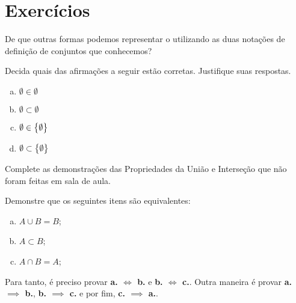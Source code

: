 \section{Exercícios}

\begin{exercise}
\label{exe:vazio-notacao}
	De que outras formas podemos representar o  utilizando as duas notações de definição de conjuntos que conhecemos?
\end{exercise}


\begin{exercise}
	Decida quais das afirmações a seguir estão corretas. Justifique suas respostas.
	\begin{enumerate}[a.]
		\item $\emptyset \in \emptyset$	
		\item $\emptyset \subset \emptyset$
		\item $\emptyset \in \left\{ \emptyset\right\}$
		\item $\emptyset \subset \left\{ \emptyset\right\}$
	\end{enumerate}
\end{exercise}



\begin{exercise}
Complete as demonstrações das Propriedades da União e Interseção que não foram feitas em sala de aula.
\end{exercise}

\begin{exercise}
Demonstre que os seguintes itens são equivalentes:
	\begin{enumerate}[a.]
		\item $A \cup B = B$;
		\item $A \subset B$;
		\item $A \cap B = A$;
	\end{enumerate}
	\begin{tip}
		Para tanto, é preciso provar \textbf{a. $\iff$ b.} e \textbf{b. $\iff$ c.}.
		Outra maneira é provar \textbf{a. $\implies$ b.}, \textbf{b. $\implies$ c.} e por fim, \textbf{c. $\implies$ a.}.
	\end{tip}
\end{exercise}


